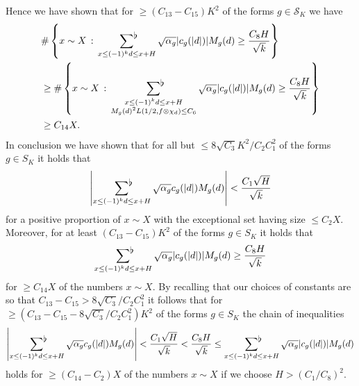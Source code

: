 \documentclass[a4paper,10pt,twoside]{amsart}
\theoremstyle{definition}
\numberwithin{equation}{section}
\renewcommand\:{\colon}
\newcommand{\sumflat}{\mathop{{\sum}^{\raisebox{-3pt}{\makebox[0pt][l]{$\flat$}}}}}
\begin{document}
Hence we have shown that for $\geq (C_{13}-C_{15})K^2$ of the forms $g\in \mathcal S_K$ we have
\begin{align*}
&\#\left\{x\sim X\,:\,\sumflat_{x\leq (-1)^kd\leq x+H}\sqrt{\alpha_g}|c_g(|d|)|M_g(d)\geq\frac{C_8 H}{\sqrt k}\right\}\\
&\geq\#\left\{x\sim X\,:\,\sumflat_{\substack{x\leq (-1)^kd\leq x+H\\
M_g(d)^2L(1/2,f\otimes\chi_d)\leq C_6}}\sqrt{\alpha_g}|c_g(|d|)|M_g(d)\geq\frac{C_8 H}{\sqrt k}\right\}\\
&\geq C_{14}X.
\end{align*}
In conclusion we have shown that for all but $\leq 8\sqrt{C_3}K^2/C_2C_1^2$ of the forms $g\in S_K$ it holds that 
\[ 
\left|\sumflat_{x\leq (-1)^kd\leq x+H}\sqrt{\alpha_g}c_g(|d|)M_g(d)\right|<\frac{C_1\sqrt H}{\sqrt k}
\]
for a positive proportion of $x\sim X$ with the exceptional set having size $\leq C_2X$. Moreover, for at least $(C_{13}-C_{15})K^2$ of the forms $g\in S_K$ it holds that 
\[ 
\sumflat_{x\leq (-1)^kd\leq x+H}\sqrt{\alpha_g}|c_g(|d|)|M_g(d)\geq\frac{C_8 H}{\sqrt k}
\]
for $\geq C_{14}X$ of the numbers $x\sim X$. By recalling that our choices of constants are so that $C_{13}-C_{15}>8\sqrt{C_3}/C_2C_1^2$ it follows that for $\geq (C_{13}-C_{15}-8\sqrt{C_3}/C_2C_1^2)K^2$ of the forms $g\in S_K$ the chain of inequalities
\begin{align}\label{ineq-chain}
\left|\sumflat_{x\leq (-1)^kd\leq x+H}\sqrt{\alpha_g}c_g(|d|)M_g(d)\right|<\frac{C_1\sqrt H}{\sqrt k}<\frac{C_8 H}{\sqrt k}\leq \sumflat_{x\leq (-1)^kd\leq x+H}\sqrt{\alpha_g}|c_g(|d|)|M_g(d) 
\end{align}
holds for $\geq (C_{14}-C_2)X$ of the numbers $x\sim X$ if we choose $H>(C_1/C_8)^2$.
\end{document}
